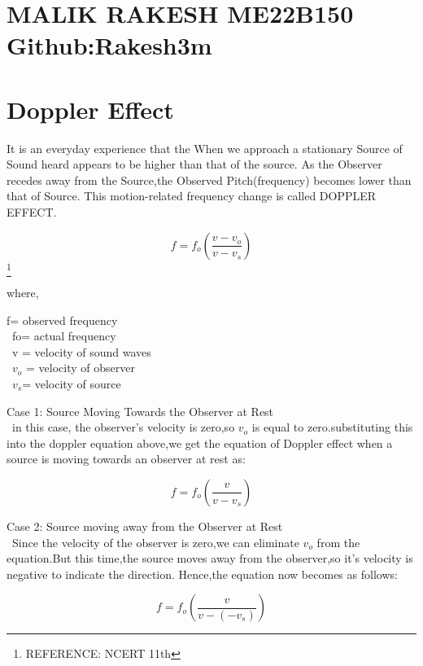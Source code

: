 


\section*{MALIK RAKESH ME22B150 Github:Rakesh3m}
\section{Doppler Effect}
It is an everyday experience that the When we approach a stationary Source of Sound heard appears to be higher than that of the source. As the Observer recedes away from the Source,the Observed Pitch(frequency) becomes lower than that of Source. This motion-related frequency change is called DOPPLER EFFECT.  


\begin{equation}
    f=f_o(\frac{v-v_o}{v-v_s})
\end{equation}\footnote{REFERENCE: NCERT 11th}

where,
\begin{center}

   f= observed frequency\\\
    fo= actual frequency\\\
    v = velocity of sound waves\\\
    $v_o$ = velocity of observer\\\
    $v_s$= velocity of source
    
\end{center} 






 Case 1: Source Moving Towards the Observer at Rest \\\
  in this case, the observer's velocity is zero,so $v_o$ is equal to zero.substituting this into the doppler equation above,we get the equation of Doppler effect when a source is moving towards an observer at rest as: 
 
 \begin{equation}
     f=f_o(\frac{v}{v-v_s})
 \end{equation}

 Case 2: Source moving away from the Observer at Rest\\\                
  Since the velocity of the observer is zero,we can eliminate
  $v_o$ from the equation.But this time,the source moves away from the observer,so it's velocity is negative to indicate the direction. Hence,the equation now becomes as follows:

\begin{equation}
    f=f_o(\frac{v}{v-(-v_s)})
\end{equation}

